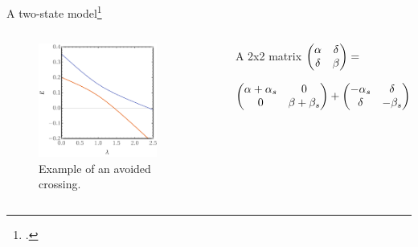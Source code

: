 \documentclass[xcolor=x11names,compress]{beamer}
\renewcommand{\(}{\begin{columns}}
\renewcommand{\)}{\end{columns}}
\newcommand{\<}[1]{\begin{column}{#1}}
\renewcommand{\>}{\end{column}}
\begin{document}
\begin{frame}{A two-state model\footcite{olsen_divergence_2000}}

\begin{columns}


\begin{figure}
    \centering
    \includegraphics[width=0.8\textwidth]{avoidedcrossing.pdf}
    \caption{Example of an avoided crossing.}
    \label{fig:my_label}
\end{figure}


\begin{beamerboxesrounded}[scheme=foncé]{A 2x2 matrix}
\centering \small{$\mqty(\alpha & \delta \\ \delta & \beta)  =$} 

\vspace{0.15cm}

\small{$\mqty(\alpha + \alpha_s & 0 \\ 0 & \beta + \beta_s ) + \mqty(- \alpha_s & \delta \\ \delta & - \beta_s)$}

\end{beamerboxesrounded}
\vspace{1cm}
\end{columns}
    
\end{frame}
\end{document}
